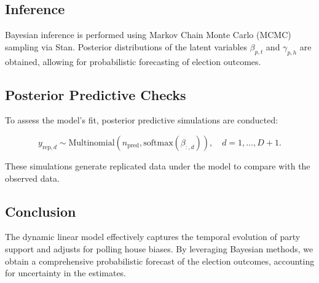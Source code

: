 \documentclass[
  letterpaper,
  DIV=11,
  numbers=noendperiod]{scrartcl}
\begin{document}
\subsection{Inference}\label{inference}

Bayesian inference is performed using Markov Chain Monte Carlo (MCMC)
sampling via Stan. Posterior distributions of the latent variables
\(\beta_{p,t}\) and \(\gamma_{p,h}\) are obtained, allowing for
probabilistic forecasting of election outcomes.

\subsection{Posterior Predictive
Checks}\label{posterior-predictive-checks}

To assess the model's fit, posterior predictive simulations are
conducted:

\[
y_{\text{rep}, d} \sim \text{Multinomial}\left( n_{\text{pred}}, \text{softmax}\left( \beta_{:, d} \right) \right), \quad d = 1, \dots, D+1.
\]

These simulations generate replicated data under the model to compare
with the observed data.

\subsection{Conclusion}\label{conclusion}

The dynamic linear model effectively captures the temporal evolution of
party support and adjusts for polling house biases. By leveraging
Bayesian methods, we obtain a comprehensive probabilistic forecast of
the election outcomes, accounting for uncertainty in the estimates.
\end{document}
